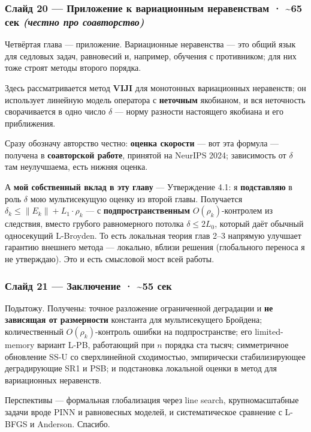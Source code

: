 \documentclass[12pt]{article}
\newenvironment{spoken}{%
  \par\addvspace{0.45em}\begingroup
  \color{spokencol}%
  \setlength{\leftskip}{1.5em}\setlength{\rightskip}{0.2em}%
  \setlength{\parindent}{0pt}%
  \everypar{\llap{{\color{barcol}\vrule width 2pt height 0.9em depth 0.35em}\hspace{0.9em}}}%
}{%
  \par\endgroup\addvspace{0.45em}}
\begin{document}
\subsubsection*{\color{headcol} Слайд 20 — Приложение к вариационным неравенствам  ·  \textasciitilde{}65 сек  \textit{(честно про соавторство)}}
\begin{spoken}
Четвёртая глава — приложение. Вариационные неравенства — это общий язык для седловых задач, равновесий и, например, обучения с противником; для них тоже строят методы второго порядка.\par
Здесь рассматривается метод \textbf{VIJI} для монотонных вариационных неравенств; он использует линейную модель оператора с \textbf{неточным} якобианом, и вся неточность сворачивается в одно число \(\delta \) — норму разности настоящего якобиана и его приближения.\par
Сразу обозначу авторство честно: \textbf{оценка скорости} — вот эта формула — получена в \textbf{соавторской работе}, принятой на NeurIPS 2024; зависимость от \(\delta \) там неулучшаема, есть нижняя оценка.\par
А \textbf{мой собственный вклад в эту главу} — Утверждение 4.1: я \textbf{подставляю} в роль \(\delta \) мою мультисекущую оценку из второй главы. Получается \(\delta _{k}  \le  \|E_{k}\| + L_{1}\cdot \rho _{k}\) — с \textbf{подпространственным} \(O(\rho _{k})\)-контролем из следствия, вместо грубого равномерного потолка \(\delta   \le  2L_{0}\), который даёт обычный односекущий L-Broyden. То есть локальная теория глав 2–3 напрямую улучшает гарантию внешнего метода — локально, вблизи решения (глобального переноса я не утверждаю). Это и есть смысловой мост всей работы.\par
\end{spoken}

\subsubsection*{\color{headcol} Слайд 21 — Заключение  ·  \textasciitilde{}55 сек}
\begin{spoken}
Подытожу. Получены: точное разложение ограниченной деградации и \textbf{не зависящая от размерности} константа для мультисекущего Бройдена; количественный \(O(\rho _{k})\)-контроль ошибки на подпространстве; его limited-memory вариант L-PB, работающий при \(n\) порядка ста тысяч; симметричное обновление SS-U со сверхлинейной сходимостью, эмпирически стабилизирующее деградирующие SR1 и PSB; и подстановка локальной оценки в метод для вариационных неравенств.\par
Перспективы — формальная глобализация через line search, крупномасштабные задачи вроде PINN и равновесных моделей, и систематическое сравнение с L-BFGS и Anderson. Спасибо.\par
\end{spoken}
\end{document}
